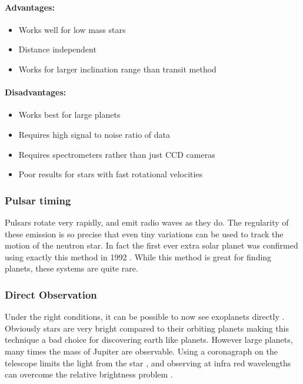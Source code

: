 \paragraph{Advantages:}
\begin{itemize}
    \item Works well for low mass stars
    \item Distance independent
    \item Works for larger inclination range than transit method
\end{itemize}

\paragraph{Disadvantages:}
\begin{itemize}
    \item Works best for large planets
    \item Requires high signal to noise ratio of data
    \item Requires spectrometers rather than just CCD cameras
    \item Poor results for stars with fast rotational velocities
\end{itemize}

\subsubsection{Pulsar timing}

Pulsars rotate very rapidly, and emit radio waves as they do. The regularity of these emission is so precise that even tiny variations can be used to track the motion of the neutron star. In fact the first ever extra solar planet was confirmed using exactly this method in 1992 \parencite{wolszczan1992planetary}. While this method is great for finding planets, these systems are quite rare.

\subsubsection{Direct Observation}

Under the right conditions, it can be possible to now see exoplanets directly \parencite{lafreniere2010directly,kuzuhara2013direct,delorme2013direct}. Obviously stars are very bright compared to their orbiting planets making this technique a bad choice for discovering earth like planets. However large planets, many times the mass of Jupiter are observable. Using a coronagraph on the telescope limits the light from the star \parencite{kuchner2002coronagraph}, and observing at infra red wavelengths can overcome the relative brightness problem \parencite{delorme2013direct}.
